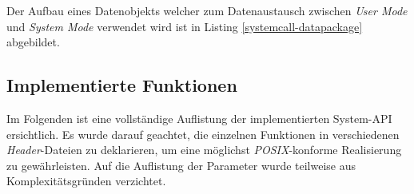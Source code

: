 Der Aufbau eines Datenobjekts welcher zum Datenaustausch zwischen \textit{User Mode} und \textit{System Mode} verwendet wird ist in Listing \ref{systemcall-datapackage} abgebildet.



\subsection{Implementierte Funktionen}
Im Folgenden ist eine vollständige Auflistung der implementierten System-API ersichtlich. Es wurde darauf geachtet, die einzelnen Funktionen in verschiedenen \textit{Header}-Dateien zu deklarieren, um eine möglichst \textit{POSIX}-konforme Realisierung zu gewährleisten. Auf die Auflistung der Parameter wurde teilweise aus Komplexitätsgründen verzichtet.

